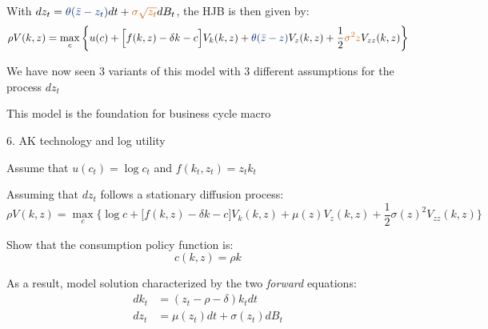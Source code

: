 \documentclass[11pt, aspectratio=169]{beamer}
\newenvironment{witemize}{\itemize\addtolength{\itemsep}{10pt}}{\enditemize}
\begin{document}
\begin{frame}{}
\begin{witemize}
\item With $dz_t = {\color{blue} \theta(\bar z - z_t) } dt + {\color{red} \sigma \sqrt{z_t} } dB_t$, the HJB is then given by:
\begin{equation*}
	\rho V(k, z) = \max_c \bigg\{ u(c) + \Big[ f(k, z) - \delta k - c \Big] V_k(k, z) + {\color{blue} \theta(\bar z - z) } V_z(k, z) + \frac{1}{2} {\color{red} \sigma^2 z } V_{zz}(k, z) \bigg\}
\end{equation*}

\item We have now seen 3 variants of this model with 3 different assumptions for the process $dz_t$

\item This model is the foundation for business cycle macro 
\end{witemize}
\end{frame}


\begin{frame}{6. AK technology and log utility}
\begin{witemize}
\item Assume that $u(c_t) = \log c_t$ and $f(k_t, z_t) = z_t k_t$

\item Assuming that $dz_t$ follows a stationary diffusion process:
\begin{equation*}
	\rho V(k, z) = \max_c \bigg\{ \log c + \Big[ f(k, z) - \delta k - c \Big] V_k(k, z) + \mu(z) V_z(k, z) + \frac{1}{2} \sigma(z)^2 V_{zz}(k, z) \bigg\}
\end{equation*}

\item Show that the consumption policy function is:
\begin{equation*}
	c(k, z) = \rho k
\end{equation*}

\item As a result, model solution characterized by the two \textit{forward} equations:
\begin{align*}
	dk_t &= (z_t - \rho - \delta) k_t dt \\
	dz_t &= \mu(z_t) dt + \sigma(z_t) dB_t
\end{align*}

\end{witemize}
\end{frame}
\end{document}
